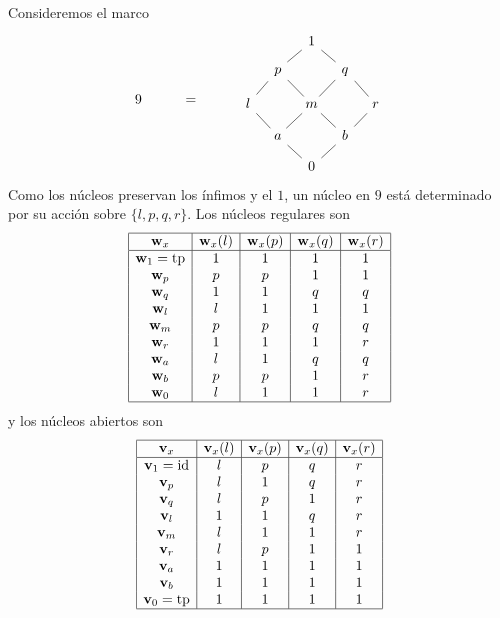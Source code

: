 \begin{exa}%
  Consideremos el marco
  \[
      9 \hspace{10mm} = \hspace{10mm} 
      \begin{tikzcd}[row sep=3mm, column sep=3mm]
          & & 1 \\
          & p \ar[ur,no head] && q \ar[ul,no head] \\
          l \ar[ur,no head]
              && m \ar[ul,no head] \ar[ur,no head]
              && r \ar[ul,no head] \\
          & a \ar[ul,no head]\ar[ur,no head]
              && b\ar[ul,no head]\ar[ur,no head] \\
          & & 0 \ar[ul,no head]\ar[ur,no head]
      \end{tikzcd}
  \]
  Como los núcleos preservan los ínfimos y el $1$, un núcleo en $9$
  está determinado por su acción sobre $\{l,p,q,r\}$.
  Los núcleos regulares son
  \[ 
      \begin{array}{|c|c|c|c|c|}
          \hline
      \mathbf w_{x} & \mathbf w_{x}(l) & \mathbf w_{x}(p) & \mathbf w_{x}(q) & \mathbf w_{x}(r) \\
          \hline
    \mathbf w_{1} = \mathrm{tp} &  1   & 1    & 1    & 1 \\
          \mathbf w_{p} &  p   & p    & 1    & 1 \\
          \mathbf w_{q} &  1   & 1    & q    & q \\
          \mathbf w_{l} &  l   & 1    & 1    & 1 \\
          \mathbf w_{m} &  p   & p    & q    & q \\
          \mathbf w_{r} &  1   & 1    & 1    & r \\
          \mathbf w_{a} &  l   & 1    & q    & q \\
          \mathbf w_{b} &  p   & p    & 1    & r \\
          \mathbf w_{0} &  l   & 1    & 1    & r \\
          \hline
      \end{array}
  \]
  y los núcleos abiertos son
  \[ 
      \begin{array}{|c|c|c|c|c|}
          \hline
       \mathbf v_{x} & \mathbf v_{x}(l) & \mathbf v_{x}(p) & \mathbf v_{x}(q) & \mathbf v_{x}(r) \\
          \hline
    \mathbf v_{1} = \mathrm{id} &  l   & p    & q    & r \\
          \mathbf v_{p} &  l   & 1    & q    & r \\
          \mathbf v_{q} &  l   & p    & 1    & r \\
          \mathbf v_{l} &  1   & 1    & q    & r \\
          \mathbf v_{m} &  l   & 1    & 1    & r \\
          \mathbf v_{r} &  l   & p    & 1    & 1 \\
          \mathbf v_{a} &  1   & 1    & 1    & 1 \\
          \mathbf v_{b} &  1   & 1    & 1    & 1 \\
    \mathbf v_{0} = \mathrm{tp} &  1   & 1    & 1    & 1 \\
          \hline
      \end{array}
  \]
\end{exa}


